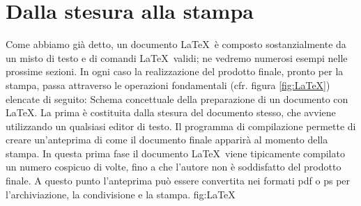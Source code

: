 \section{Dalla stesura alla stampa}

Come abbiamo gi\`a detto, un documento \LaTeX\ \`e composto sostanzialmente da
un misto di testo e di comandi \LaTeX\ validi; ne vedremo numerosi esempi
nelle prossime sezioni.
In ogni caso la realizzazione del prodotto finale, pronto per la stampa,
passa attraverso le operazioni fondamentali (cfr. figura \ref{fig:LaTeX})
elencate di seguito:
\panelfig
{}
{Schema concettuale della preparazione di un documento con \LaTeX.
La prima \`e costituita dalla stesura del documento stesso, che avviene
utilizzando un qualsiasi editor di testo.
Il programma di compilazione permette di creare un'anteprima di come il
documento finale apparir\`a al momento della stampa. In questa prima fase il
documento \LaTeX\ viene tipicamente compilato un numero cospicuo di volte,
fino a che l'autore non \`e soddisfatto del prodotto finale. A questo punto
l'anteprima pu\`o essere convertita nei formati pdf o ps per l'archiviazione,
la condivisione e la stampa.}
{fig:LaTeX}
